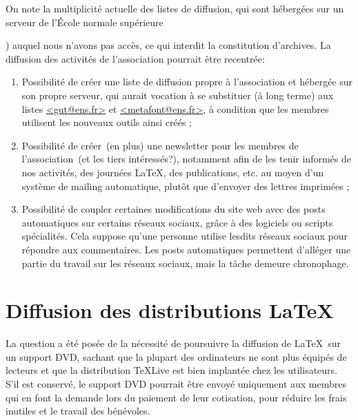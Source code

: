 \documentclass{tufte-handout}
\newcommand{\ratio}[3][]{\marginpar{\footnotesize{\textcolor{teal}{Temps requis: #2 / Utilité: #3}\par\noindent \textcolor{teal}{#1}}}}
\begin{document}
On note la multiplicité actuelle des listes de diffusion, qui sont hébergées sur
un serveur de l'École normale supérieure~{) auquel nous n'avons pas
accès, ce qui interdit la constitution d'archives. La diffusion des activités
de l'association pourrait être recentrée:

\begin{enumerate}
\item Possibilité de créer\ratio[Simple, mais \emph{quid} de
  l'efficacité]{+}{+} une liste de diffusion propre à l'association et
  hébergée sur son propre serveur, qui aurait vocation à se substituer (à long
  terme) aux listes \url{<gut@ens.fr>} et \url{<metafont@ens.fr>}, à condition
  que les membres utilisent les nouveaux outils ainsi créés ;
\item Possibilité de créer~(en plus) une newsletter\ratio[Simple et utile pour
  toucher davantage d'utilisateurs]{+}{++} pour les membres de
  l'association~(et les tiers intéressés?), notamment afin de les tenir
  informés de nos activités, des journées \LaTeX, des publications, etc. au
  moyen d'un système de mailing automatique, plutôt que d'envoyer des lettres
  imprimées ;
\item Possibilité de coupler certaines modifications\ratio[Atteindre de
  nouveaux publics, mais ces médias correspondent-ils à notre
  philosophie?]{++}{+} du site web avec des posts automatiques sur certains
  réseaux sociaux, grâce à des logiciels ou scripts spécialités. Cela suppose
  qu'une personne utilise lesdits réseaux sociaux pour répondre aux
  commentaires. Les posts automatiques permettent d'alléger une partie du
  travail sur les réseaux sociaux, mais la tâche demeure chronophage.
\end{enumerate}


\section{Diffusion des distributions \LaTeX}

La question a été posée\ratio[Relativement chronophage et coûteux]{++}{+} de
la nécessité de poursuivre la diffusion de \LaTeX\ sur un support DVD, sachant
que la plupart des ordinateurs ne sont plus équipés de lecteurs et que la
distribution \TeX Live est bien implantée chez les utilisateurs. S'il est
conservé, le support DVD pourrait être envoyé uniquement aux membres qui en
font la demande lors du paiement de leur cotisation, pour réduire les frais
inutiles et le travail des bénévoles.


}
\end{document}
